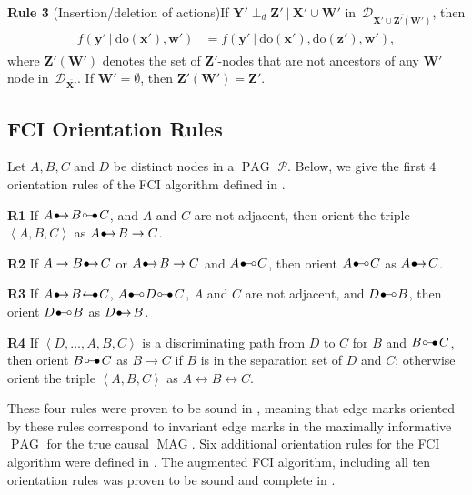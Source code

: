 \documentclass[11pt,a4paper]{article}
\newcommand{\ddo}{\textrm{do}}
\newcommand\given[1][]{\:#1\vert\:}
\newcommand{\dsepp}{\perp_{d}}
\DeclareMathOperator{\MAG}{MAG}
\DeclareMathOperator{\PAG}{PAG}
\newcommand{\g}[1][G]{\mathcal{#1}}
\newcommand{\bulletcirc}{
  \setlength{\unitlength}{1mm}
  \begin{picture}(5,1)(0,0)
    \put(0.2,0){$\bullet$}
    \put(1.1, 1){\line(1,0){2.4}}
    \put(4, 1){\circle{1}}
  \end{picture}
}
\newcommand{\circbullet}{
  \setlength{\unitlength}{1mm}
  \begin{picture}(5,1)(0,0)
    \put(1,1){\circle{1}}
    \put(1.5,1){\line(1,0){2.4}}
    \put(2.9,0){$\bullet$}
  \end{picture}
}
\newcommand{\bulletarrow}{
  \setlength{\unitlength}{1mm}
  \begin{picture}(5,1)(0,0)
    \put(0.2,0){$\bullet$}
    \put(1,0){$\rightarrow$}
  \end{picture}
}
\newcommand{\arrowbullet}{
  \setlength{\unitlength}{1mm}
  \begin{picture}(5,1)(0,0)
    \put(0.2,0){$\leftarrow$}
    \put(3,0){$\bullet$}
  \end{picture}
}
\begin{document}
\textbf{Rule 3} (Insertion/deletion of actions)If $\mathbf{Y'} \dsepp \mathbf{Z'} \given \mathbf{X'} \cup \mathbf{W'}$ in~$\g[D]_{\overline{\mathbf{X' \cup Z'(W')}}}$, then
\begin{align} \label{rule3}
\begin{split}
 f(\mathbf{y'} \given \ddo(\mathbf{x'}),\mathbf{w'}) & = f(\mathbf{y'} \given \ddo(\mathbf{x'}),\ddo(\mathbf{z'}),\mathbf{w'}),
\end{split}
\end{align}
where $\mathbf{Z'(W')}$ denotes the set of $\mathbf{Z'}$-nodes that are not ancestors of any $\mathbf{W'}$ node in~$\g[D]_{\overline{\mathbf{X'}}}$.
If $\mathbf{W'} = \emptyset$, then $\mathbf{Z'}(\mathbf{W'}) = \mathbf{Z'}$.

\subsection{FCI Orientation Rules \citep[][p183]{spirtes2000causation}}

Let $A,B,C$ and $D$ be distinct nodes in a $\PAG$ $\g[P]$.
Below, we give the first $4$ orientation rules of the FCI algorithm defined in \cite{spirtes2000causation}.

\noindent\textbf{R1} If $A \bulletarrow B \circbullet C$, and $A$ and $C$ are not adjacent, then orient the triple $\left\langle A,B,C \right\rangle$ as $A \bulletarrow B \rightarrow C$.

\noindent\textbf{R2} If $A \rightarrow B \bulletarrow C$ or $A \bulletarrow B \rightarrow C$ and $A \bulletcirc C$, then orient $A \bulletcirc C$ as $A \bulletarrow C$.

\noindent\textbf{R3} If $A \bulletarrow B  \arrowbullet C$, $A \bulletcirc D \circbullet C$, $A$ and $C$ are not adjacent, and $D \bulletcirc B$, then orient $D \bulletcirc B$ as $D \bulletarrow B$.

\noindent\textbf{R4} If $\left\langle D, \dots ,A,B, C \right\rangle$ is a discriminating path from $D$ to $C$ for $B$ and $B \circbullet C$, then orient $B \circbullet C$ as $B \rightarrow C$ if $B$ is in the separation set of $D$ and $C$; otherwise orient the triple $\left\langle A,B,C \right\rangle$ as $A \leftrightarrow B \leftrightarrow C$.


\noindent{}These four rules were proven to be sound in \cite{spirtes2000causation}, meaning that edge marks oriented by these rules correspond to invariant edge marks in the maximally informative $\PAG$ for the true causal $\MAG$.
Six additional orientation rules for the FCI algorithm were defined in \cite{zhang2008completeness}.
The augmented FCI algorithm, including all ten orientation rules was proven to be sound and complete in \cite{zhang2008completeness}.
\end{document}

